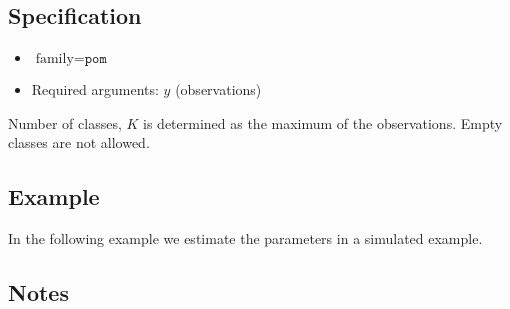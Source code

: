 \documentclass[a4paper,11pt]{article}
\begin{document}
\subsection*{Specification}

\begin{itemize}
\item $\text{family}=\texttt{pom}$
\item Required arguments: $y$ (observations)
\end{itemize}
Number of classes, $K$ is determined as the maximum of the
observations. Empty classes are not allowed.

\subsection*{Example}

In the following example we estimate the parameters in a simulated
example.


\subsection*{Notes}
\end{document}
